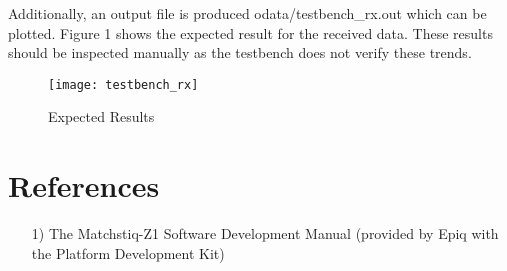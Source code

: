 \begin{flushleft}
Additionally, an output file is produced odata/testbench\_rx.out which can be plotted. Figure 1 shows the expected result for the received data. These results should be inspected manually as the testbench does not verify these trends.\par\bigskip
	\begin{figure}[ht]
		\centerline{\texttt{[image: testbench\_rx]}}
		\caption{Expected Results}
		\label{fig:tb}
	\end{figure}
\end{flushleft}

\section*{References}
\begin{flushleft}
	\begin{itemize}
		\item[1)] The Matchstiq-Z1 Software Development Manual (provided by Epiq with the Platform Development Kit)
	\end{itemize}
\end{flushleft}

